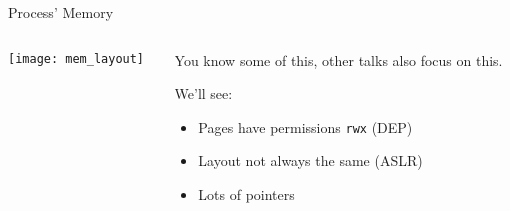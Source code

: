 \documentclass[beamer]{uibk}
\begin{document}
\begin{frame}{Process' Memory}
    \begin{columns}
        \begin{column}{0.5\textwidth}
            \begin{center}
                \texttt{[image: mem\_layout]}
            \end{center}
        \end{column}
        \begin{column}{0.5\textwidth}
            You know some of this, other talks also focus on this.

            \bigskip

            We'll see:
            \begin{itemize}
                \item Pages have permissions \texttt{rwx} (DEP)
                \item Layout not always the same (ASLR)
                \item Lots of pointers
            \end{itemize}
        \end{column}
    \end{columns}
\end{frame}
\end{document}
